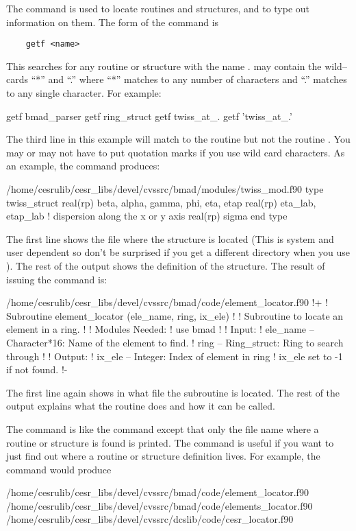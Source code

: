 The  command is used to locate routines and structures, and
to type out information on them.  The form of the command is
\begin{verbatim}
    getf <name>
\end{verbatim}
This searches for any routine or structure with the name
.  may contain the wild--cards ``*'' and ``.'' where
``*'' matches to any number of characters and ``.'' matches to any
single character. For example:
\begin{example}
    getf bmad_parser
    getf ring_struct
    getf twiss_at_.
    getf 'twiss_at_.'
\end{example}
The third line in this example will match to the routine
 but not the routine . You may or
may not have to put quotation marks if you use wild card characters.
As an example, the command  produces:
\begin{example}
  /home/cesrulib/cesr_libs/devel/cvssrc/bmad/modules/twiss_mod.f90
    type twiss_struct
      real(rp) beta, alpha, gamma, phi, eta, etap
      real(rp) eta_lab, etap_lab   ! dispersion along the x or y axis
      real(rp) sigma
    end type
\end{example}
The first line shows the file where the structure is located (This is
system and user dependent so don't be surprised if you get a different
directory when you use ). The rest of the output shows the
definition of the  structure.  The result of issuing
the command  is:
\begin{example}
  /home/cesrulib/cesr_libs/devel/cvssrc/bmad/code/element_locator.f90
  !+
  ! Subroutine element_locator (ele_name, ring, ix_ele)
  !
  ! Subroutine to locate an element in a ring. 
  !
  ! Modules Needed:
  !   use bmad
  !
  ! Input:
  !   ele_name -- Character*16: Name of the element to find.
  !   ring     -- Ring_struct: Ring to search through
  !
  ! Output:
  !   ix_ele -- Integer: Index of element in ring%
  !               ix_ele set to -1 if not found.
  !-
\end{example}
The first line again shows in what file the subroutine is located.
The rest of the output explains what the routine does and how it
can be called.

The  command is like the  command except that only
the file name where a routine or structure is found is printed.
The  command is useful if you
want to just find out where a routine or structure definition lives.
For example, the  command would produce
\begin{example}
  /home/cesrulib/cesr_libs/devel/cvssrc/bmad/code/element_locator.f90
  /home/cesrulib/cesr_libs/devel/cvssrc/bmad/code/elements_locator.f90
  /home/cesrulib/cesr_libs/devel/cvssrc/dcslib/code/cesr_locator.f90
\end{example}

